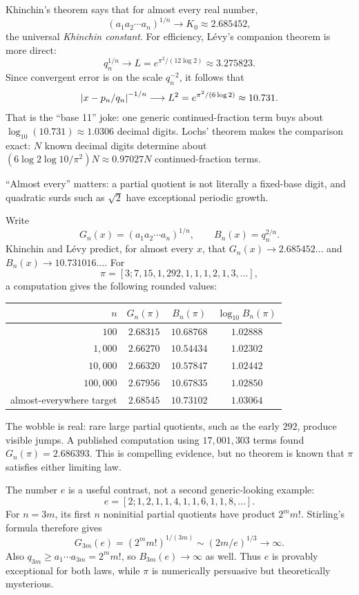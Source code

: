 \begin{labbox}[title={Aside: continued fractions are roughly ``base 11''}]
Khinchin's theorem says that for almost every real number,
\[
  (a_1a_2\cdots a_n)^{1/n}\longrightarrow
  K_0\approx2.685452,
\]
the universal \emph{Khinchin constant}. For efficiency, L\'evy's companion
theorem is more direct:
\[
 q_n^{1/n}\longrightarrow
 L=e^{\pi^2/(12\log2)}\approx3.275823.
\]
Since convergent error is on the scale $q_n^{-2}$, it follows that
\[
 \left|x-p_n/q_n\right|^{-1/n}\longrightarrow
 L^2=e^{\pi^2/(6\log2)}\approx10.731.
\]
That is the ``base 11'' joke: one generic continued-fraction term buys about
$\log_{10}(10.731)\approx1.0306$ decimal digits. Lochs' theorem makes the
comparison exact: $N$ known decimal digits determine about
$(6\log2\log10/\pi^2)N\approx0.97027N$ continued-fraction terms.

``Almost every'' matters: a partial quotient is not literally a fixed-base
digit, and quadratic surds such as $\sqrt2$ have exceptional periodic growth.
\end{labbox}

\begin{checkpoint}[title={Experiment: $\pi$ looks typical; $e$ does not},breakable=false]
Write
\[
 G_n(x)=(a_1a_2\cdots a_n)^{1/n},
 \qquad B_n(x)=q_n^{2/n}.
\]
Khinchin and L\'evy predict, for almost every $x$, that
$G_n(x)\to2.685452\dots$ and $B_n(x)\to10.731016\dots$. For
\[
 \pi=[3;7,15,1,292,1,1,1,2,1,3,\dots],
\]
a computation gives the following rounded values:
\begin{center}
\small
\begin{tabular}{rccc}
\toprule
$n$ & $G_n(\pi)$ & $B_n(\pi)$ & $\log_{10}B_n(\pi)$ \\
\midrule
$100$     & $2.68315$ & $10.68768$ & $1.02888$ \\
$1{,}000$ & $2.66270$ & $10.54434$ & $1.02302$ \\
$10{,}000$ & $2.66320$ & $10.57847$ & $1.02442$ \\
$100{,}000$ & $2.67956$ & $10.67835$ & $1.02850$ \\
\midrule
almost-everywhere target & $2.68545$ & $10.73102$ & $1.03064$ \\
\bottomrule
\end{tabular}
\end{center}
The wobble is real: rare large partial quotients, such as the early $292$,
produce visible jumps. A published computation using $17{,}001{,}303$ terms
found $G_n(\pi)=2.686393$. This is compelling evidence, but no theorem is known
that $\pi$ satisfies either limiting law.

The number $e$ is a useful contrast, not a second generic-looking example:
\[
 e=[2;1,2,1,1,4,1,1,6,1,1,8,\dots].
\]
For $n=3m$, its first $n$ noninitial partial quotients have product $2^m m!$.
Stirling's formula therefore gives
\[
 G_{3m}(e)=(2^m m!)^{1/(3m)}\sim(2m/e)^{1/3}\longrightarrow\infty.
\]
Also $q_{3m}\geq a_1\cdots a_{3m}=2^m m!$, so $B_{3m}(e)\to\infty$ as well.
Thus $e$ is provably exceptional for both laws, while $\pi$ is numerically
persuasive but theoretically mysterious.
\end{checkpoint}

